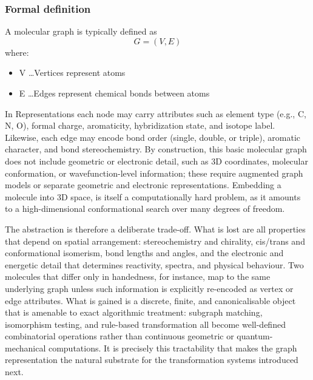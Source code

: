 \subsubsection{Formal definition}

A molecular graph is typically defined as \cite[p.~2]{Ehrlich2012}
\begin{equation}
    \label{eq:mol-graph}
    G = (V, E)
\end{equation}
where:
\begin{itemize}
    \item V \ldots Vertices represent atoms
    \item E \ldots Edges represent chemical bonds between atoms
\end{itemize}

In Representations each node may carry attributes such as element type (e.g., C, N, O), formal charge, aromaticity, hybridization state, and isotope label.
Likewise, each edge may encode bond order (single, double, or triple), aromatic character, and bond stereochemistry. \cite[pp.~4--5]{Wojtuch2023}
By construction, this basic molecular graph does not include geometric or electronic detail, such as 3D coordinates, molecular conformation, or wavefunction-level information; these require augmented graph models or separate geometric and electronic representations.
\cite[pp.~3--4]{Wojtuch2023} \cite[p.~595]{Kearnes2016}
Embedding a molecule into 3D space, is itself a computationally hard problem, as it amounts to a high-dimensional conformational search over many degrees of freedom.

The abstraction is therefore a deliberate trade-off.
What is lost are all properties that depend on spatial arrangement: stereochemistry and chirality, cis/trans and conformational isomerism, bond lengths and angles, and the electronic and energetic detail that determines reactivity, spectra, and physical behaviour.
Two molecules that differ only in handedness, for instance, map to the same underlying graph unless such information is explicitly re-encoded as vertex or edge attributes. \cite[pp.~4--5]{Wojtuch2023}
What is gained is a discrete, finite, and canonicalisable object that is amenable to exact algorithmic treatment: subgraph matching, isomorphism testing, and rule-based transformation all become well-defined combinatorial operations rather than continuous geometric or quantum-mechanical computations. \cite[pp.~2--3]{Andersen2013}
It is precisely this tractability that makes the graph representation the natural substrate for the transformation systems introduced next.



